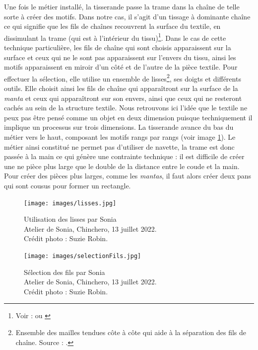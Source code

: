 \documentclass[a4paper, twoside, 12pt]{book}
\begin{document}
Une fois le métier installé, la tisserande passe la trame dans la chaîne de telle sorte à créer des motifs. Dans notre cas, il s'agit d'un tissage à dominante chaîne ce qui signifie que les fils de chaînes recouvrent la surface du textile, en dissimulant la trame (qui est à l'intérieur du tissu)\footnote{Voir : \cite[p.~1]{centreinternationaldetudedestextilesanciensVocabulaireTechniqueFrancais2020} ou \cite[p.~77]{emeryPrimaryStructuresFabrics1995}}. Dans le cas de cette technique particulière, les fils de chaîne qui sont choisis apparaissent sur la surface et ceux qui ne le sont pas apparaissent sur l'envers du tissu, ainsi les motifs apparaissent en miroir d'un côté et de l'autre de la pièce textile. Pour effectuer la sélection, elle utilise un ensemble de lisses\footnote{Ensemble des mailles tendues côte à côte qui aide à la séparation des fils de chaîne. Source : \cite[p.~29]{centreinternationaldetudedestextilesanciensVocabulaireTechniqueFrancais2020}.}, ses doigts et différents outils. Elle choisit ainsi les fils de chaîne qui apparaîtront sur la surface de la \textit{manta} et ceux qui apparaîtront sur son envers, ainsi que ceux qui ne resteront cachés au sein de la structure textile. Nous retrouvons ici l'idée que le textile ne peux pas être pensé comme un objet en deux dimension puisque techniquement il implique un processus sur trois dimensions. La tisserande avance du bas du métier vers le haut, composant les motifs rangs par rangs (voir image \ref{choix}). Le métier ainsi constitué ne permet pas d'utiliser de navette, la trame est donc passée à la main ce qui génère une contrainte technique : il est difficile de créer une ne pièce plus large que le double de la distance entre le coude et la main. Pour créer des pièces plus larges, comme les \textit{mantas}, il faut alors créer deux pans qui sont cousus pour former un rectangle.

\begin{figure}[!h]
    \begin{minipage}[c]{.5\linewidth}
            \begin{center}
                \texttt{[image: images/lisses.jpg]}
                \caption[Lisses]{Utilisation des lisses par Sonia\\ Atelier de Sonia, Chinchero, 13 juillet 2022. \\ Crédit photo : Suzie Robin.}
                \label{lisses}
            \end{center}
    \end{minipage}
    \begin{minipage}[c]{.5\linewidth}
        \begin{center}
            \texttt{[image: images/selectionFils.jpg]}
            \caption[Sélection des fils]{Sélection des fils par Sonia\\ Atelier de Sonia, Chinchero, 13 juillet 2022. \\ Crédit photo : Suzie Robin.}
            \label{choix}
        \end{center}
    \end{minipage}
\end{figure}
\end{document}
